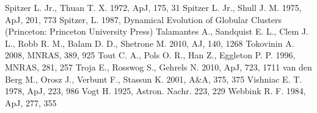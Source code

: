 \begin{thebibliography}{99}
  Spitzer L. Jr., Thuan T. X. 1972, ApJ, 175, 31
  Spitzer L. Jr., Shull J. M. 1975, ApJ, 201, 773
 Spitzer,
  L. 1987, Dynamical Evolution of Globular Clusters (Princeton:
  Princeton University Press)
 Talamantes A., Sandquist E. L., Clem
  J. L., Robb R. M., Balam D. D., Shetrone M. 2010, AJ, 140, 1268 
  Tokovinin A. 2008, MNRAS, 389, 925
 Tout
  C. A., Pols O. R., Han Z., Eggleton P. P. 1996, MNRAS, 281, 257
 Troja E., Rosswog S., Gehrels N. 2010,
  ApJ, 723, 1711
 van den Berg M., Orosz J., Verbunt F.,
  Stassun K. 2001, A\&A, 375, 375 
 Vishniac
  E. T. 1978, ApJ, 223, 986
 Vogt H. 1925,
  Astron. Nachr. 223, 229
 Webbink
  R. F. 1984, ApJ, 277, 355

\end{thebibliography}



%